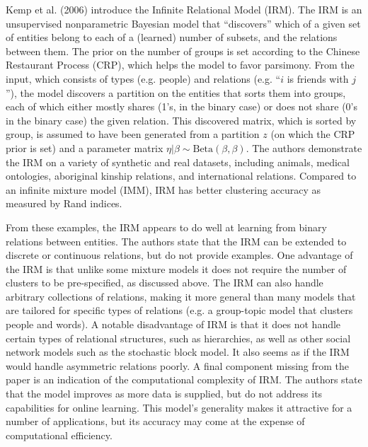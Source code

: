 \documentclass[12pt,letterpaper]{article}
\begin{document}


Kemp et al. (2006) introduce the Infinite Relational Model (IRM).
The IRM is an unsupervised nonparametric Bayesian model that ``discovers'' which of a given set of entities belong to each of a (learned) number of subsets, and the relations between them. 
The prior on the number of groups is set according to the Chinese Restaurant Process (CRP), which helps the model to favor parsimony.
From the input, which consists of types (e.g. people) and relations (e.g. ``$i$ is friends with $j$''), the model discovers a partition on the entities that sorts them into groups, each of which either mostly shares (1's, in the binary case) or does not share (0's in the binary case) the given relation.
This discovered matrix, which is sorted by group, is assumed to have been generated from a partition $z$ (on which the CRP prior is set) and a parameter matrix $\eta|\beta \sim \text{Beta}(\beta, \beta)$. 
The authors demonstrate the IRM on a variety of synthetic and real datasets, including animals, medical ontologies, aboriginal kinship relations, and international relations. 
Compared to an infinite mixture model (IMM), IRM has better clustering accuracy as measured by Rand indices.

From these examples, the IRM appears to do well at learning from binary relations between entities.
The authors state that the IRM can be extended to discrete or continuous relations, but do not provide examples. 
One advantage of the IRM is that unlike some mixture models it does not require the number of clusters to be pre-specified, as discussed above.
The IRM can also handle arbitrary collections of relations, making it more general than many models that are tailored for specific types of relations (e.g. a group-topic model that clusters people and words). 
A notable disadvantage of IRM is that it does not handle certain types of relational structures, such as hierarchies, as well as other social network models such as the stochastic block model. 
It also seems as if the IRM would handle asymmetric relations poorly.
A final component missing from the paper is an indication of the computational complexity of IRM. The authors state that the model improves as more data is supplied, but do not address its capabilities for online learning. This model's generality makes it attractive for a number of applications, but its accuracy may come at the expense of computational efficiency.
\end{document}
